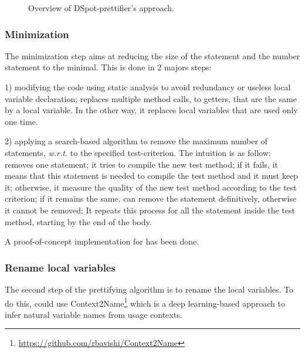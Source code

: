 \begin{figure}
	\label{fig:dspot-prettifier-overview}
	\caption{Overview of DSpot-prettifier's approach.}
\end{figure}

\subsubsection{Minimization}
\label{subsubsec:conclusion:short-prespectives:prettifier:miminize}
The minimization step aims at reducing the size of the statement and the number statement to the minimal.
This is done in 2 majors steps:

1) modifying the code using static analysis to avoid redundancy or useless local variable declaration;
\dspotprettifier replaces multiple method calls, \eg to getters, that are the same by a local variable.
In the other way, it replaces local variables that are used only one time.

2) applying a search-based algorithm to remove the maximum number of statements, \emph{w.r.t.} to the specified test-criterion.
The intuition is as follow:
\dspotprettifier removes one statement;
it tries to compile the new test method;
if it fails, it means that this statement is needed to compile the test method and it must keep it;
otherwise, it measure the quality of the new test method according to the test criterion;
if it remains the same, \dspotprettifier can remove the statement definitively, otherwise it cannot be removed;
It repeats this process for all the statement inside the test method, starting by the end of the body.

A proof-of-concept implementation for \ms has been done.

\subsubsection{Rename local variables}
\label{subsubsec:conclusion:short-prespectives:prettifier:rename-local}

The second step of the prettifying algorithm is to rename the local variables.
To do this, \dspotprettifier could use Context2Name\footnote{\url{https://github.com/rbavishi/Context2Name}}\cite{DBLP:journals/corr/abs-1809-05193} which is a deep learning-based approach to infer natural variable names from usage contexts.

